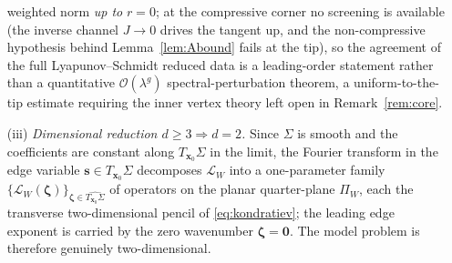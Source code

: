 \begin{proposition}
\begin{enumerate}
              weighted norm \emph{up to} $r=0$; at the compressive corner no screening is available (the inverse
              channel $J\to0$ drives the tangent up, and the non-compressive hypothesis behind
              Lemma~\ref{lem:Abound} fails at the tip), so the agreement of the full Lyapunov--Schmidt reduced data is
              a leading-order statement rather than a quantitative $\mathcal{O}(\lambda^{g})$ spectral-perturbation
              theorem, a uniform-to-the-tip estimate requiring the inner vertex theory left open in
              Remark~\ref{rem:core}.
        \item[\textup{(iii)}] \emph{Dimensional reduction $d\ge3\Rightarrow d=2$.} Since $\Sigma$ is smooth and the
              coefficients are constant along $T_{\bm{x}_0}\Sigma$ in the limit, the Fourier transform in the edge variable
              $\bm{s}\in T_{\bm{x}_0}\Sigma$ decomposes $\mathcal{L}_W$ into a one-parameter family
              $\{\mathcal{L}_W(\bm{\zeta})\}_{\bm{\zeta}\in\widehat{T_{\bm{x}_0}\Sigma}}$ of operators on the planar
              quarter-plane $\Pi_W$, each the transverse two-dimensional pencil of \eqref{eq:kondratiev}; the leading edge
              exponent is carried by the zero wavenumber $\bm{\zeta}=\bm0$. The model problem is therefore genuinely
              two-dimensional.
    \end{enumerate}
\end{proposition}

